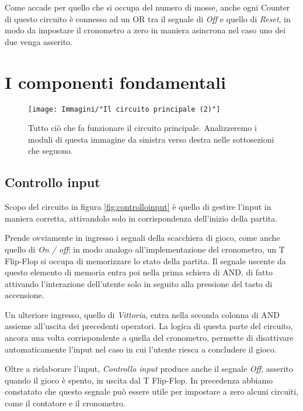 \documentclass[11pt]{article}
\begin{document}
Come accade per quello che si occupa del numero di mosse, anche ogni Counter di questo circuito è connesso ad un OR tra il segnale di {\itshape Off} e quello di {\itshape Reset}, in modo da impostare il cronometro a zero in maniera asincrona nel caso uno dei due venga asserito.



\section{I componenti fondamentali}
\label{sec:icomponentifondamentali}

\begin{figure}[H]
\centering
\texttt{[image: Immagini/"Il circuito principale (2)"]}
\caption{{\small Tutto ciò che fa funzionare il circuito principale. Analizzeremo i moduli di questa immagine da sinistra verso destra nelle sottosezioni che seguono.}}
\label{fig:ilcircuitoprincipale(2)}
\end{figure}


\subsection{Controllo input}

Scopo del circuito in figura \underline{\vref{fig:controlloinput}} è quello di gestire l'input in maniera corretta, attivandolo solo in corrispondenza dell'inizio della partita. 

Prende ovviamente in ingresso i segnali della scacchiera di gioco, come anche quello di {\itshape On / off}; in modo analogo all'implementazione del cronometro, un T Flip-Flop si occupa di memorizzare lo stato della partita. Il segnale uscente da questo elemento di memoria entra poi nella prima schiera di AND, di fatto attivando l'interazione dell'utente solo in seguito alla pressione del tasto di accensione.

Un ulteriore ingresso, quello di {\itshape Vittoria}, entra nella seconda colonna di AND assieme all'uscita dei precedenti operatori. La logica di questa parte del circuito, ancora una volta corrispondente a quella del cronometro, permette di disattivare automaticamente l'input nel caso in cui l'utente riesca a concludere il gioco.

Oltre a rielaborare l'input, {\itshape Controllo input} produce anche il segnale {\itshape Off}, asserito quando il gioco è spento, in uscita dal T Flip-Flop. In precedenza abbiamo constatato che questo segnale può essere utile per impostare a zero alcuni circuiti, come il contatore e il cronometro.
\end{document}

